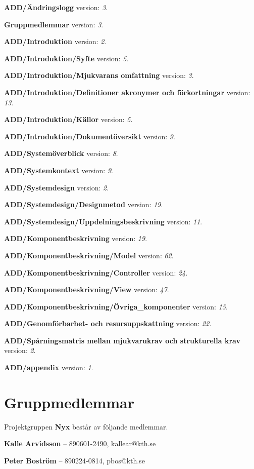 \documentclass[a4paper, twoside, 11pt, titlepage]{article}
\begin{document}
\textbf{ADD/Ändringslogg} version: \emph{3}.

\textbf{Gruppmedlemmar} version: \emph{3}.

\textbf{ADD/Introduktion} version: \emph{2}.

\textbf{ADD/Introduktion/Syfte} version: \emph{5}.

\textbf{ADD/Introduktion/Mjukvarans omfattning} version: \emph{3}.

\textbf{ADD/Introduktion/Definitioner akronymer och förkortningar} version: \emph{13}.

\textbf{ADD/Introduktion/Källor} version: \emph{5}.

\textbf{ADD/Introduktion/Dokumentöversikt} version: \emph{9}.

\textbf{ADD/Systemöverblick} version: \emph{8}.

\textbf{ADD/Systemkontext} version: \emph{9}.

\textbf{ADD/Systemdesign} version: \emph{2}.

\textbf{ADD/Systemdesign/Designmetod} version: \emph{19}.

\textbf{ADD/Systemdesign/Uppdelningsbeskrivning} version: \emph{11}.

\textbf{ADD/Komponentbeskrivning} version: \emph{19}.

\textbf{ADD/Komponentbeskrivning/Model} version: \emph{62}.

\textbf{ADD/Komponentbeskrivning/Controller} version: \emph{24}.

\textbf{ADD/Komponentbeskrivning/View} version: \emph{47}.

\textbf{ADD/Komponentbeskrivning/Övriga\_komponenter} version: \emph{15}.

\textbf{ADD/Genomförbarhet- och resursuppskattning} version: \emph{22}.

\textbf{ADD/Spårningsmatris mellan mjukvarukrav och strukturella krav} version: \emph{2}.

\textbf{ADD/appendix} version: \emph{1}.

\clearpage
\section*{Gruppmedlemmar}


Projektgruppen \textbf{Nyx} består av följande medlemmar.

\textbf{Kalle Arvidsson} -- 890601-2490, kallear@kth.se

\textbf{Peter Boström} -- 890224-0814, pbos@kth.se
\end{document}
